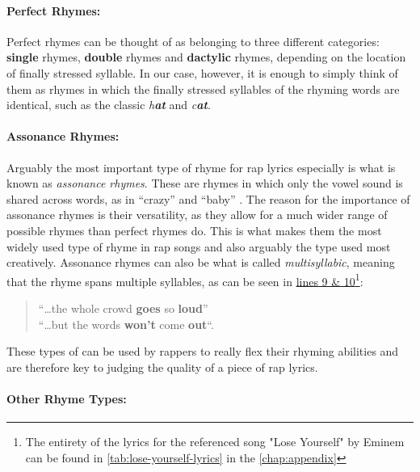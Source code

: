\paragraph{Perfect Rhymes:\\[6pt]}
\label{para:perfect-rhymes}

Perfect rhymes can be thought of as belonging to three different categories: \textbf{single} rhymes, \textbf{double} rhymes and \textbf{dactylic} rhymes, depending on the location of finally stressed syllable. In our case, however, it is enough to simply think of them as rhymes in which the finally stressed syllables of the rhyming words are identical, such as the classic \textit{h\textbf{at}} and \textit{c\textbf{at}}.

\paragraph{Assonance Rhymes:\\[6pt]}
\label{para:assonance-rhymes}

Arguably the most important type of rhyme for rap lyrics especially is what is known as \textit{assonance rhymes}. These are rhymes in which only the vowel sound is shared across words, as in “crazy” and “baby” \cite{Malmi_2016}. The reason for the importance of assonance rhymes is their versatility, as they allow for a much wider range of possible rhymes than perfect rhymes do. This is what makes them the most widely used type of rhyme in rap songs and also arguably the type used most creatively. Assonance rhymes can also be what is called \textit{multisyllabic}, meaning that the rhyme spans multiple syllables, as can be seen in \hyperref[tab:lose-yourself-lyrics]{lines 9 \& 10}\footnote{The entirety of the lyrics for the referenced song "Lose Yourself" by Eminem can be found in \cref{tab:lose-yourself-lyrics} in the \cref{chap:appendix}}:

\begin{quote}\small{
    “…the whole crowd \textbf{goes} so \textbf{loud}” \\
    “…but the words \textbf{won’t} come \textbf{out}“.}
\end{quote}

These types of can be used by rappers to really flex their rhyming abilities and are therefore key to judging the quality of a piece of rap lyrics.

\paragraph{Other Rhyme Types:\\[6pt]}
\label{para:other-rhyme-types}

